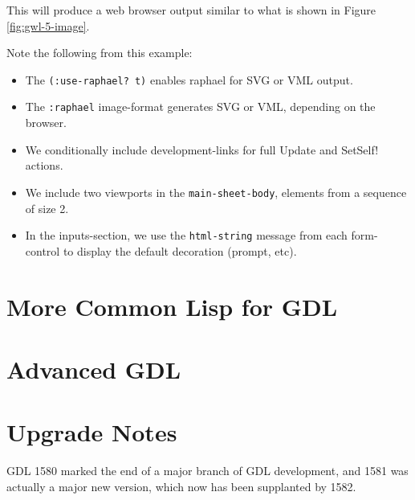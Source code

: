 \documentclass [11pt]{book}
\begin{document}
This will produce a web browser output similar to what is shown in Figure 
\ref{fig:gwl-5-image}.



Note the following from this example:

\begin{itemize}

\item The \texttt{(:use-raphael? t)} enables raphael for SVG or VML output.

\item The \texttt{:raphael} image-format generates SVG or VML, depending on the browser.

\item We conditionally include development-links for full Update and SetSelf! actions.

\item We include two viewports in the \texttt{main-sheet-body}, elements from a sequence of size 2.

\item In the inputs-section, we use
                  the \texttt{html-string} message from each
                  form-control to display the default
                  decoration (prompt, etc).

\end{itemize}





\chapter{More Common Lisp for GDL}

\label{chap:morecommonlispforgdl}



\chapter{Advanced GDL}

\label{chap:advancedgdl}



\chapter*{Upgrade Notes}

\label{chap:upgradenotes}

GDL 1580 marked the end of a major branch of GDL development,
and 1581 was actually a major new version, which now has been
supplanted by 1582. 
\end{document}
